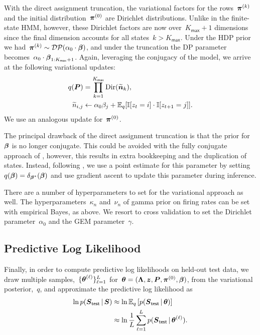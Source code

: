 With the direct assignment truncation, the variational factors for the
rows~$\boldsymbol{\pi}^{(k)}$ and the initial distribution~$\boldsymbol{\pi}^{(0)}$ are
Dirichlet distributions. Unlike in the finite-state HMM, however,
these Dirichlet factors are now over~${K_{\mathsf{max}}+1}$ dimensions since the final
dimension accounts for all states~${k>K_{\mathsf{max}}}$. Under the HDP prior we
had~${\boldsymbol{\pi}^{(k)} \sim \mathcal{DP}(\alpha_0 \cdot \boldsymbol{\beta})}$, and under the
truncation the DP parameter becomes~$\alpha_0 \cdot
\boldsymbol{\beta}_{1:K_{\mathsf{max}}+1}$.
Again, leveraging the conjugacy of the model, we arrive at the
following variational updates:
\begin{align*}
q(\boldsymbol{P}) &= \prod_{k=1}^{K_{\mathsf{max}}} \mathrm{Dir}(\widetilde{\boldsymbol{n}}_k), \\
\widetilde{n}_{i,j} &\leftarrow \alpha_0 \beta_j + \mathbb{E}_q[\mathbb{I}[z_t=i]\cdot\mathbb{I}[z_{t+1}=j]].
\end{align*}
We use an analogous update for~$\boldsymbol{\pi}^{(0)}$.

The principal drawback of the direct assignment truncation is that the
prior for~$\boldsymbol{\beta}$ is no longer conjugate. This could be avoided with
the fully conjugate approach of \citep{Hoffman-2013}, however, this
results in extra bookkeeping and the duplication of states. Instead,
following \citep{Johnson14, Bryant12, Liang07}, we use a point
estimate for this parameter by setting~${q(\boldsymbol{\beta})=\delta_{\boldsymbol{\beta}^*}}(\boldsymbol{\beta})$
and use gradient ascent to update this
parameter during inference.

There are a number of hyperparameters to set for the variational
approach as well. The hyperparameters~$\kappa_n$ and~$\nu_n$ of
gamma prior on firing rates can be set with empirical Bayes, as
above. We resort to cross validation to set the Dirichlet
parameter~$\alpha_0$ and the GEM parameter~$\gamma$.
 

\subsection{Predictive Log Likelihood}
Finally, in order to compute predictive log likelihoods on held-out
test data, we draw multiple samples,~$\{\boldsymbol{\theta}^{(\ell)}\}_{\ell=1}^L$
for~$\boldsymbol{\theta}=(\boldsymbol{\Lambda}, \boldsymbol{z}, \boldsymbol{P}, \boldsymbol{\pi}^{(0)}, \boldsymbol{\beta})$, from the
variational posterior,~$q$, and approximate the predictive log likelihood as
\begin{align*}
  \ln p(\boldsymbol{S}_{\mathsf{test}} \,|\, \boldsymbol{S}) 
  &\approx \ln \mathbb{E}_q\left[p(\boldsymbol{S}_{\mathsf{test}} \,|\, \boldsymbol{\theta})\right] \\
  &\approx \ln \frac{1}{L} \sum_{\ell=1}^L p(\boldsymbol{S}_{\mathsf{test}} \,|\, \boldsymbol{\theta}^{(\ell)}).
\end{align*}

